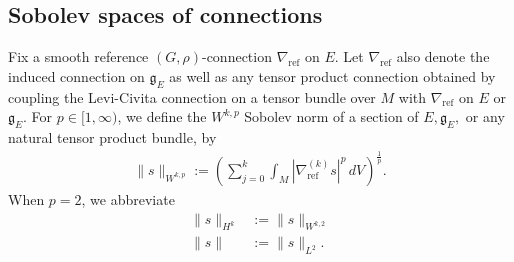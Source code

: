 \documentclass[12pt]{amsart}
\renewcommand{\1}{{\mathbf 1}}
\theoremstyle{others}
\numberwithin{equation}{section}
\begin{document}
\subsection{Sobolev spaces of connections}
 Fix a smooth reference \((G, \rho)\)-connection \(\nabla_{\text{ref}}\) on $E.$ Let \(\nabla_{\text{ref}}\) also denote the induced connection on \(\mathfrak{g}_E\) as well as any tensor product connection obtained by coupling the Levi-Civita connection on a tensor bundle over \(M\) with \(\nabla_{\text{ref}}\) on \(E\) or \(\mathfrak{g}_E\). For \(p \in [1, \infty)\), we define the \(W^{k, p}\) Sobolev norm of a section of \(E, \mathfrak{g}_E,\) or any natural tensor product bundle, by
\begin{align}
    \|s\|_{W^{k, p}} := \left(\sum_{j = 0}^k \int_M |\nabla_{\text{ref}}^{(k)} s|^p \, dV \right)^{\frac{1}{p}}.
\end{align} When \(p = 2\), we abbreviate
\begin{align*}
    \|s\|_{H^k} &:= \|s\|_{W^{k, 2}} \\
    \|s\| &:= \|s\|_{L^2}.
\end{align*}



\end{document}
